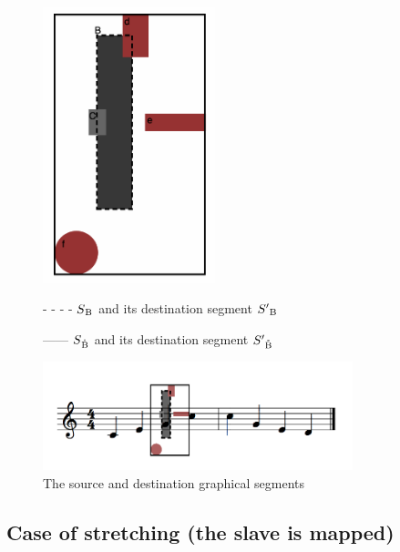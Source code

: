 \documentclass[a4paper]{article}
\begin{document}
\begin{figure}[h]
\begin{multicols}{2}
\begin{center}
\includegraphics[width=5cm]{img/score3.png} 
\end{center}
\columnbreak

\bigskip

\begin{center}
 - - - -  $S\textsubscript{B}$ and its destination segment $S'\textsubscript{B}$

\bigskip

 ------  $S\textsubscript{\r{B}}$ and its destination segment $S'\textsubscript{\r{B}}$

\bigskip

\includegraphics[width=9cm]{img/scorefinalbox.png}

\end{center}

\end{multicols}

\caption{The source and destination graphical segments}
\label{fig:mapping}

\end{figure}

\subsection{Case of stretching (the slave is mapped)}\label{subsec:complexMap}
\end{document}
